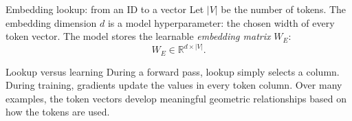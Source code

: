 \begin{frame}{Embedding lookup: from an ID to a vector}
  \small
  Let \(|V|\) be the number of tokens. The embedding dimension \(d\) is a model
  hyperparameter: the chosen width of every token vector. The model stores the
  learnable \emph{embedding matrix} \(W_E\):
  \[
    W_E\in\mathbb{R}^{d\times |V|}.
  \]

  \begin{center}
  \end{center}

  \begin{block}{Lookup versus learning}
    During a forward pass, lookup simply selects a column. During training,
    gradients update the values in every token column. Over many examples,
    the token vectors develop meaningful geometric relationships based on how
    the tokens are used.
  \end{block}
\end{frame}

